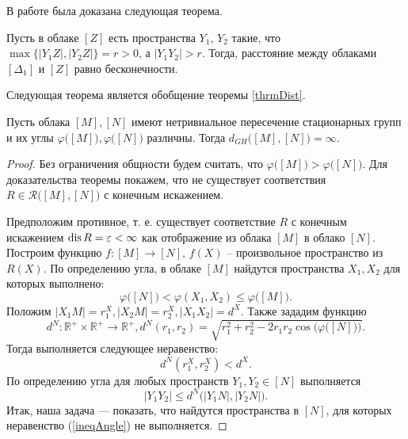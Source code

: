 В работе была доказана следующая теорема.
\begin{thm}
    Пусть в облаке \( [Z] \) есть пространства $Y_{1}$, $ Y_{2}$ такие,
    что \\$\max\big\{ |Y_{1}Z|, |Y_{2} Z| \big\} = r>0$, а $|Y_{1}
    Y_{2}|>r$. Тогда, расстояние между облаками $[\Delta_1]$ и $[Z]$
    равно бесконечности. \label{thrmDist}
\end{thm}
Следующая теорема является обобщение теоремы \ref{thrmDist}.
\begin{thm}
    Пусть облака \( [M], [N] \) имеют нетривиальное пересечение
    стационарных групп и их углы \( \varphi \big([M]\big), \varphi
    \big([N]\big) \) различны. Тогда \( d_{GH} \big([M], [N]\big) =
    \infty \).
\end{thm}
\begin{proof}
    Без ограничения общности будем считать, что \( \varphi \big([M]\big)>
    \varphi \big([N]\big) \). Для доказательства теоремы покажем, что не
    существует соответствия \( R\in \mathcal{R}\big([M],[N]\big) \) с
    конечным искажением.

    Предположим противное, т. е. существует соответствие \( R \) с
    конечным искажением \( \operatorname{dis} R = \varepsilon < \infty \) как
    отображение из облака \( [M] \) в облако \( [N] \). Построим функцию
    \( f \colon [M] \rightarrow [N] \), \( f(X) \) -- произвольное
    пространство из \(
    R(X)
    \). По определению угла, в облаке \( [M] \) найдутся пространства \(
    X_1, X_2 \) для которых выполнено:
    \[
        \varphi \big([N]\big) < \varphi (X_1, X_2) \le \varphi
    \big([M]\big). \]
    Положим \( |X_1 M| = r_1^X,  |X_2 M| = r_2^X, | X_1 X_2 | = d^X\).
    Также зададим функцию
    \[ d^N \colon \mathbb{R}^+ \times \mathbb{R}^+ \rightarrow
        \mathbb{R}^+, d^N(r_1, r_2) =
        \sqrt{r_1^2 + r_2^2 - 2r_1r_2\cos\Big(\varphi \big([N]\big)\Big)}.
    \]
    Тогда выполняется следующее неравенство:
    \begin{equation}
        d^N(r_1^X, r_2^X) < d^X.
        \label{ineqdx}
    \end{equation}
    По определению угла для любых пространств \( Y_1, Y_2 \in [N] \)
    выполняется
    \begin{equation}
        | Y_1 Y_2 | \le d^N\big(| Y_1N |, | Y_2N |\big). \label{ineqAngle}
    \end{equation}
    Итак, наша задача --- показать, что найдутся пространства в \( [N]
    \), для которых неравенство (\ref{ineqAngle}) не выполняется.


\end{proof}
